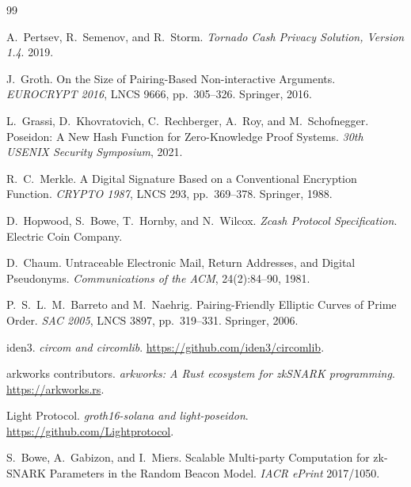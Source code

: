 \documentclass[11pt]{article}
\begin{document}
\begin{thebibliography}{99}

A.~Pertsev, R.~Semenov, and R.~Storm.
\emph{Tornado Cash Privacy Solution, Version 1.4}. 2019.

J.~Groth.
On the Size of Pairing-Based Non-interactive Arguments.
\emph{EUROCRYPT 2016}, LNCS 9666, pp.\ 305--326. Springer, 2016.

L.~Grassi, D.~Khovratovich, C.~Rechberger, A.~Roy, and M.~Schofnegger.
Poseidon: A New Hash Function for Zero-Knowledge Proof Systems.
\emph{30th USENIX Security Symposium}, 2021.

R.~C.~Merkle.
A Digital Signature Based on a Conventional Encryption Function.
\emph{CRYPTO 1987}, LNCS 293, pp.\ 369--378. Springer, 1988.

D.~Hopwood, S.~Bowe, T.~Hornby, and N.~Wilcox.
\emph{Zcash Protocol Specification}. Electric Coin Company.

D.~Chaum.
Untraceable Electronic Mail, Return Addresses, and Digital Pseudonyms.
\emph{Communications of the ACM}, 24(2):84--90, 1981.

P.~S.~L.~M.~Barreto and M.~Naehrig.
Pairing-Friendly Elliptic Curves of Prime Order.
\emph{SAC 2005}, LNCS 3897, pp.\ 319--331. Springer, 2006.

iden3.
\emph{circom and circomlib}. \url{https://github.com/iden3/circomlib}.

arkworks contributors.
\emph{arkworks: A Rust ecosystem for zkSNARK programming}.
\url{https://arkworks.rs}.

Light Protocol.
\emph{groth16-solana and light-poseidon}.
\url{https://github.com/Lightprotocol}.

S.~Bowe, A.~Gabizon, and I.~Miers.
Scalable Multi-party Computation for zk-SNARK Parameters in the Random Beacon
Model. \emph{IACR ePrint} 2017/1050.

\end{thebibliography}
\end{document}
